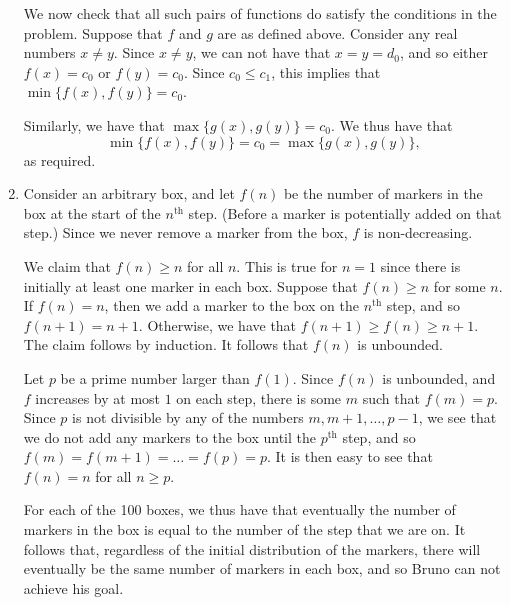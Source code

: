\documentclass[12pt]{article}
\begin{document}
\begin{enumerate}
We now check that all such pairs of functions do satisfy the conditions in the
problem. Suppose that $f$ and $g$ are as defined above. Consider any real
numbers $x \neq y$. Since $x \neq y$, we can not have that $x = y = d_0$, and so
either $f(x) = c_0$ or $f(y) = c_0$. Since $c_0 \leq c_1$, this implies that
$\min\{ f(x), f(y) \} = c_0$.

Similarly, we have that $\max\{ g(x), g(y) \} = c_0$. We thus have that
\[
    \min\{ f(x), f(y) \} = c_0 = \max\{ g(x), g(y) \},
\]
as required.

\item %
Consider an arbitrary box, and let $f(n)$ be the number of markers in the box at
the start of the $n^\text{th}$ step. (Before a marker is potentially added on
that step.) Since we never remove a marker from the box, $f$ is non-decreasing.

We claim that $f(n) \geq n$ for all $n$. This is true for $n = 1$ since there is
initially at least one marker in each box. Suppose that $f(n) \geq n$ for some
$n$. If $f(n) = n$, then we add a marker to the box on the $n^\text{th}$ step,
and so $f(n + 1) = n + 1$. Otherwise, we have that $f(n + 1) \geq f(n) \geq n +
1$. The claim follows by induction. It follows that $f(n)$ is unbounded.

Let $p$ be a prime number larger than $f(1)$. Since $f(n)$ is unbounded, and $f$
increases by at most $1$ on each step, there is some $m$ such that $f(m) = p$.
Since $p$ is not divisible by any of the numbers $m, m + 1, \dots, p - 1$, we
see that we do not add any markers to the box until the $p^\text{th}$ step, and
so $f(m) = f(m + 1) = \dots = f(p) = p$. It is then easy to see that $f(n) = n$
for all $n \geq p$.

For each of the 100 boxes, we thus have that eventually the number of markers
in the box is equal to the number of the step that we are on. It follows that,
regardless of the initial distribution of the markers, there will
eventually be the same number of markers in each box, and so Bruno can not
achieve his goal.


\end{enumerate}
\end{document}
